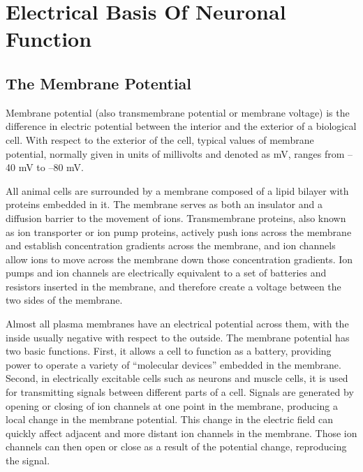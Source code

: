 \hypertarget{electrical-basis-of-neuronal-function}{%
\chapter{Electrical Basis Of Neuronal Function}\label{electrical-basis-of-neuronal-function}}

\hypertarget{the-membrane-potential}{%
\section{The Membrane Potential}\label{the-membrane-potential}}

Membrane potential (also transmembrane potential or membrane voltage) is the difference in electric potential between the interior and the exterior of a biological cell. With respect to the exterior of the cell, typical values of membrane potential, normally given in units of millivolts and denoted as mV, ranges from --40 mV to --80 mV.

All animal cells are surrounded by a membrane composed of a lipid bilayer with proteins embedded in it. The membrane serves as both an insulator and a diffusion barrier to the movement of ions. Transmembrane proteins, also known as ion transporter or ion pump proteins, actively push ions across the membrane and establish concentration gradients across the membrane, and ion channels allow ions to move across the membrane down those concentration gradients. Ion pumps and ion channels are electrically equivalent to a set of batteries and resistors inserted in the membrane, and therefore create a voltage between the two sides of the membrane.

Almost all plasma membranes have an electrical potential across them, with the inside usually negative with respect to the outside. The membrane potential has two basic functions. First, it allows a cell to function as a battery, providing power to operate a variety of ``molecular devices'' embedded in the membrane. Second, in electrically excitable cells such as neurons and muscle cells, it is used for transmitting signals between different parts of a cell. Signals are generated by opening or closing of ion channels at one point in the membrane, producing a local change in the membrane potential. This change in the electric field can quickly affect adjacent and more distant ion channels in the membrane. Those ion channels can then open or close as a result of the potential change, reproducing the signal.

